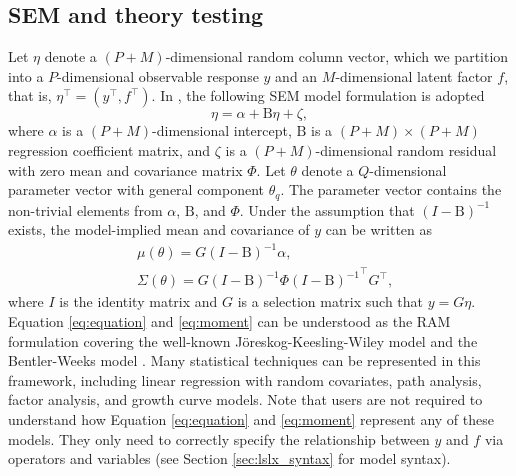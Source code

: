 \documentclass[nojss]{jss}
\begin{document}
\subsection{SEM and theory testing}
Let $\eta$ denote a $(P+M)$-dimensional random column vector, which we partition into a $P$-dimensional observable response $y$ and an $M$-dimensional latent factor $f$, that is, $\eta^\top=(y^\top,f^\top)$. In , the following SEM model formulation is adopted
%
\begin{equation} \label{eq:equation}
\eta = \alpha + \mathrm{B} \eta + \zeta,
\end{equation}
%
where $\alpha$ is a $(P+M)$-dimensional intercept, $\mathrm{B}$ is a $(P+M) \times (P+M)$ regression coefficient matrix, and $\zeta$ is a $(P+M)$-dimensional random residual with zero mean and covariance matrix $\Phi$. Let $\theta$ denote a $Q$-dimensional parameter vector with general component $\theta_q$. The parameter vector contains the non-trivial elements from $\alpha$, $\mathrm{B}$, and $\Phi$. Under the assumption that $(I-\mathrm{B})^{-1}$ exists, the model-implied mean and covariance of $y$ can be written as
%
\begin{equation} \label{eq:moment}
\begin{aligned}
& \mu(\theta) = G (I-\mathrm{B})^{-1} \alpha, \\
& \Sigma(\theta)= G (I-\mathrm{B})^{-1} \Phi {(I-\mathrm{B})^{-1}}^\top G^\top,
\end{aligned}
\end{equation}
%
where $I$ is the identity matrix and $G$ is a selection matrix such that $y=G\eta$. Equation \ref{eq:equation} and \ref{eq:moment} can be understood as the RAM formulation \citep{McArdle1984a} covering the well-known J{\"{o}}reskog-Keesling-Wiley model \citep{Keesling1972,Joreskog1973,Wiley1973} and the Bentler-Weeks model \citep{Bentler1980}. Many statistical techniques can be represented in this framework, including linear regression with random covariates, path analysis, factor analysis, and growth curve models. Note that  users are not required to understand how Equation \ref{eq:equation} and \ref{eq:moment} represent any of these models. They only need to correctly specify the relationship between $y$ and $f$ via operators and variables (see Section \ref{sec:lslx_syntax} for model syntax).
\end{document}
